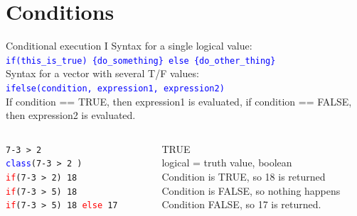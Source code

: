 \documentclass[xcolor=table,      handout ,    xcolor=dvipsnames]{beamer}\usepackage[]{graphicx}\usepackage[]{color}
\newcommand{\rcode}[1]{\texttt{\textcolor{Blue}{#1}}}
\begin{document}
\section{Conditions}

\begin{frame}[fragile]{Conditional execution I}
Syntax for a single logical value:\\
\rcode{\alert{if}(this\_is\_true) \{do\_something\} \alert{else} \{do\_other\_thing\}}\\[\baselineskip]
\pause
Syntax for a vector with several T/F values:\\
\rcode{\alert{ifelse}(condition, expression1, expression2)}\\[\baselineskip]
\pause
If condition == TRUE, then expression1 is evaluated,
if condition == FALSE, then expression2 is evaluated.\\[1em]
\pause
\begin{columns}
\begin{column}{.40\textwidth}
\texttt{7-3 > 2 \\
\textcolor{blue}{class}(7-3 > 2 ) \\
\textcolor{red}{if}(7-3 > 2) 18  \\
\textcolor{red}{if}(7-3 > 5) 18  \\
\textcolor{red}{if}(7-3 > 5) 18 \textcolor{red}{else} 17 }
\end{column}
\begin{column}{.59\textwidth}
\pause TRUE\\
\pause logical = truth value, boolean\\
\pause Condition is TRUE, so 18 is returned\\
\pause Condition is FALSE, so nothing happens\\
\pause Condition FALSE, so 17 is returned.
\end{column}
\end{columns}
\end{frame}
\end{document}
